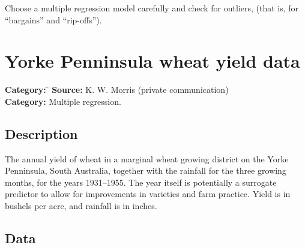\documentclass{article}
\begin{document}
Choose a multiple regression model carefully and check for outliers, (that
is, for ``bargains'' and ``rip-offs'').


\clearpage\section{Yorke Penninsula wheat yield data}
\begin{tabbing}
\textbf{Category:} \= \kill
\textbf{Source:} \> K. W. Morris (private communication)\\
\textbf{Category:} \> Multiple regression.
\end{tabbing}

\subsection*{Description}
The annual yield of wheat in a marginal wheat growing district on the Yorke
Penninsula, South Australia, together with the rainfall for the three
growing months, for the years 1931--1955.  The year itself is potentially a
surrogate predictor to allow for improvements in varieties and farm
practice.  Yield is in bushels per acre, and rainfall is in inches.

\subsection*{Data}
\end{document}

